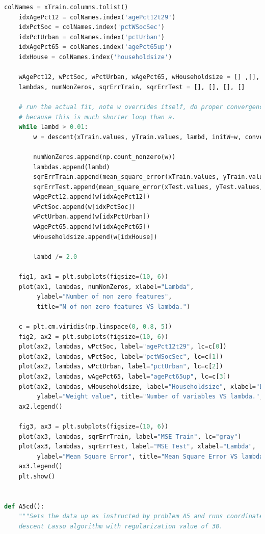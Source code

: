 \documentclass{article}
\newcommand{\1}{\mathbf{1}}
\begin{document}
\begin{enumerate}
\begin{lstlisting}[language=Python]
    colNames = xTrain.columns.tolist()
    idxAgePct12 = colNames.index('agePct12t29')
    idxPctSoc = colNames.index('pctWSocSec')
    idxPctUrban = colNames.index('pctUrban')
    idxAgePct65 = colNames.index('agePct65up')
    idxHouse = colNames.index('householdsize')

    wAgePct12, wPctSoc, wPctUrban, wAgePct65, wHouseholdsize = [] ,[], [], [], []
    lambdas, numNonZeros, sqrErrTrain, sqrErrTest = [], [], [], []

    # run the actual fit, note w overrides itself, do proper convergence
    # because this is much shorter loop than a.
    while lambd > 0.01:
        w = descent(xTrain.values, yTrain.values, lambd, initW=w, convergeFast=False)

        numNonZeros.append(np.count_nonzero(w))
        lambdas.append(lambd)
        sqrErrTrain.append(mean_square_error(xTrain.values, yTrain.values, w))
        sqrErrTest.append(mean_square_error(xTest.values, yTest.values, w))
        wAgePct12.append(w[idxAgePct12])    
        wPctSoc.append(w[idxPctSoc])
        wPctUrban.append(w[idxPctUrban])
        wAgePct65.append(w[idxAgePct65])
        wHouseholdsize.append(w[idxHouse])

        lambd /= 2.0

    fig1, ax1 = plt.subplots(figsize=(10, 6))
    plot(ax1, lambdas, numNonZeros, xlabel="Lambda",
         ylabel="Number of non zero features",
         title="N of non-zero features VS lambda.")

    c = plt.cm.viridis(np.linspace(0, 0.8, 5))
    fig2, ax2 = plt.subplots(figsize=(10, 6))
    plot(ax2, lambdas, wPctSoc, label="agePct12t29", lc=c[0])
    plot(ax2, lambdas, wPctSoc, label="pctWSocSec", lc=c[1])
    plot(ax2, lambdas, wPctUrban, label="pctUrban", lc=c[2])
    plot(ax2, lambdas, wAgePct65, label="agePct65up", lc=c[3])
    plot(ax2, lambdas, wHouseholdsize, label="Householdsize", xlabel="Lambda",
         ylabel="Weight value", title="Number of variables VS lambda.", lc=c[4])
    ax2.legend()
    
    fig3, ax3 = plt.subplots(figsize=(10, 6))
    plot(ax3, lambdas, sqrErrTrain, label="MSE Train", lc="gray")
    plot(ax3, lambdas, sqrErrTest, label="MSE Test", xlabel="Lambda",
         ylabel="Mean Square Error", title="Mean Square Error VS lambda.")
    ax3.legend()
    plt.show()


def A5cd():
    """Sets the data up as instructed by problem A5 and runs coordinate
    descent Lasso algorithm with regularization value of 30. 


\end{lstlisting}
\end{enumerate}
\end{document}
